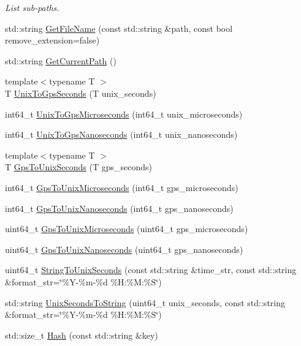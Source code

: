\begin{DoxyCompactItemize}
\begin{DoxyCompactList}\small\item\em List sub-\/paths. \end{DoxyCompactList}\item 
std\-::string \hyperlink{namespaceapollo_1_1cyber_1_1common_abf75455f4ea35d3113ed616ccec49974}{Get\-File\-Name} (const std\-::string \&path, const bool remove\-\_\-extension=false)
\item 
std\-::string \hyperlink{namespaceapollo_1_1cyber_1_1common_a3c4f6eae973c96a359e8620a45943a13}{Get\-Current\-Path} ()
\item 
{\footnotesize template$<$typename T $>$ }\\T \hyperlink{namespaceapollo_1_1cyber_1_1common_aae9936d10af030dfdfb551c342688b99}{Unix\-To\-Gps\-Seconds} (T unix\-\_\-seconds)
\item 
int64\-\_\-t \hyperlink{namespaceapollo_1_1cyber_1_1common_ac5b4d836080b5baad92dea31f5f4b3af}{Unix\-To\-Gps\-Microseconds} (int64\-\_\-t unix\-\_\-microseconds)
\item 
int64\-\_\-t \hyperlink{namespaceapollo_1_1cyber_1_1common_a4e68216c17c0ec2340ea6cf2ee06c4a6}{Unix\-To\-Gps\-Nanoseconds} (int64\-\_\-t unix\-\_\-nanoseconds)
\item 
{\footnotesize template$<$typename T $>$ }\\T \hyperlink{namespaceapollo_1_1cyber_1_1common_ad41923eb52c1c917c93e36a7daf0e3ff}{Gps\-To\-Unix\-Seconds} (T gps\-\_\-seconds)
\item 
int64\-\_\-t \hyperlink{namespaceapollo_1_1cyber_1_1common_a4f505d81ccc49b22947c435e8b7ca8d2}{Gps\-To\-Unix\-Microseconds} (int64\-\_\-t gps\-\_\-microseconds)
\item 
int64\-\_\-t \hyperlink{namespaceapollo_1_1cyber_1_1common_a2c8e6b4200784b7d24fdde19f6061f53}{Gps\-To\-Unix\-Nanoseconds} (int64\-\_\-t gps\-\_\-nanoseconds)
\item 
uint64\-\_\-t \hyperlink{namespaceapollo_1_1cyber_1_1common_aff2ca6b1b682c4cba3a03f6f54808dd0}{Gps\-To\-Unix\-Microseconds} (uint64\-\_\-t gps\-\_\-microseconds)
\item 
uint64\-\_\-t \hyperlink{namespaceapollo_1_1cyber_1_1common_af4740302b111b7839dd864274ea8624d}{Gps\-To\-Unix\-Nanoseconds} (uint64\-\_\-t gps\-\_\-nanoseconds)
\item 
uint64\-\_\-t \hyperlink{namespaceapollo_1_1cyber_1_1common_ab24dac790adc76ec3b14042dd5acf9f9}{String\-To\-Unix\-Seconds} (const std\-::string \&time\-\_\-str, const std\-::string \&format\-\_\-str=\char`\"{}\%Y-\/\%m-\/\%d \%H\-:\%M\-:\%S\char`\"{})
\item 
std\-::string \hyperlink{namespaceapollo_1_1cyber_1_1common_a090af70bab8d5e3c722443f39841e2da}{Unix\-Seconds\-To\-String} (uint64\-\_\-t unix\-\_\-seconds, const std\-::string \&format\-\_\-str=\char`\"{}\%Y-\/\%m-\/\%d \%H\-:\%M\-:\%S\char`\"{})
\item 
std\-::size\-\_\-t \hyperlink{namespaceapollo_1_1cyber_1_1common_a704695bad5b604167a9921e7fe9e65f2}{Hash} (const std\-::string \&key)
\end{DoxyCompactItemize}
